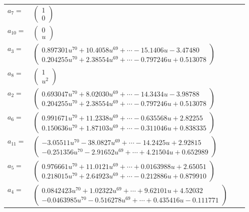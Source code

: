 \documentclass[1p]{elsarticle_modified}
\theoremstyle{definition}
\begin{document}
\begin{tabular}{m{7pt} m{180pt} m{7pt} m{180pt} }
\flushright $a_{7}=$&$\begin{pmatrix}1\\0\end{pmatrix}$ \\
\flushright $a_{10}=$&$\begin{pmatrix}0\\u\end{pmatrix}$ \\
\flushright $a_{3}=$&$\begin{pmatrix}0.897301 u^{70}+10.4058 u^{69}+\cdots-15.1406 u-3.47480\\0.204255 u^{70}+2.38554 u^{69}+\cdots-0.797246 u+0.513078\end{pmatrix}$ \\
\flushright $a_{8}=$&$\begin{pmatrix}1\\u^2\end{pmatrix}$ \\
\flushright $a_{2}=$&$\begin{pmatrix}0.693047 u^{70}+8.02030 u^{69}+\cdots-14.3434 u-3.98788\\0.204255 u^{70}+2.38554 u^{69}+\cdots-0.797246 u+0.513078\end{pmatrix}$ \\
\flushright $a_{6}=$&$\begin{pmatrix}0.991671 u^{70}+11.2338 u^{69}+\cdots-0.635568 u+2.82255\\0.150636 u^{70}+1.87103 u^{69}+\cdots-0.311046 u+0.838335\end{pmatrix}$ \\
\flushright $a_{11}=$&$\begin{pmatrix}-3.05511 u^{70}-38.0827 u^{69}+\cdots-14.2425 u+2.92815\\-0.251356 u^{70}-2.91652 u^{69}+\cdots+4.21504 u+0.652989\end{pmatrix}$ \\
\flushright $a_{5}=$&$\begin{pmatrix}0.976661 u^{70}+11.0121 u^{69}+\cdots+0.0163988 u+2.65051\\0.218015 u^{70}+2.64923 u^{69}+\cdots-0.212886 u+0.879910\end{pmatrix}$ \\
\flushright $a_{4}=$&$\begin{pmatrix}0.0842423 u^{70}+1.02322 u^{69}+\cdots+9.62101 u+4.52032\\-0.0463985 u^{70}-0.516278 u^{69}+\cdots+0.435416 u-0.111771\end{pmatrix}$ \\

\end{tabular}
\end{document}
